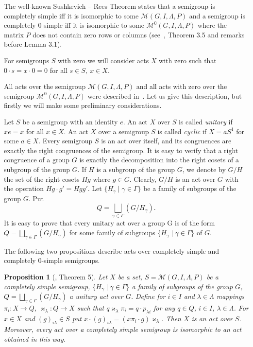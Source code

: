 \documentclass{birkau}
\numberwithin{equation}{section}
\theoremstyle{plain}
\newtheorem{proposition}[theorem]{Proposition}
\theoremstyle{definition}
\begin{document}
	The well-known Sushkevich -- Rees Theorem states that a semigroup is completely simple iff it is isomorphic to some $\mathcal{M}(G, I,\Lambda,P)$ and a semigroup is completely 0-simple iff it is isomorphic to some $\mathcal{M}^0(G,I,\Lambda,P)$ where the matrix $P$ does not contain zero rows or columns (see~\cite{cliff}, Theorem 3.5 and remarks before Lemma 3.1).
	
	For semigroups $S$ with zero we will consider acts $X$ with zero such that $0 \cdot s = x \cdot 0 = 0$ for all $s\in S,\ x\in X$.
	
	All acts over the semigroup $\mathcal{M}(G,I,\Lambda,P)$ and all acts with zero over the semigroup $\mathcal{M}^0(G,I,\Lambda,P)$ were described in~\cite{avdeev}. Let us give this description, but firstly we will make some preliminary considerations.
	
	Let $S$ be a semigroup with an identity $e$. An act $X$ over $S$ is called \textit{unitary} if $xe=x$ for all $x \in X$. An act $X$ over a semigroup $S$ is called \textit{cyclic} if $X=aS^1$ for some $a \in X$. Every semigroup $S$ is an act over itself, and its congruences are exactly the right congruences of the semigroup. It is easy to verify that a right congruence of a group $G$ is exactly the decomposition into the right cosets of a subgroup of the group $G$. If $H$ is a subgroup of the group $G$, we denote by $G/H$ the set of the right cosets $Hg$ where $g \in G$. Clearly, $G/H$ is an act over $G$ with the operation $Hg \cdot g' = Hgg'$. Let $\{ H_\gamma \mid \gamma \in \Gamma \} $ be a family of subgroups of the group $G$. Put $$ Q = \bigsqcup_{\gamma \in \Gamma} (G/H_\gamma). $$ It is easy to prove that every unitary act over a group G is of the form $ Q = \bigsqcup_{\gamma \in \Gamma} (G/H_\gamma) $ for some family of subgroups $\{ H_{\gamma} \mid \gamma \in \Gamma \}$ of $G$.
	
	The following two propositions describe acts over completely simple and completely 0-simple semigroups.
	
	\begin{proposition}[\cite{avdeev}, Theorem 5] \label{pr01}
	    Let $X$ be a set, $S=\mathcal{M}(G,I,\Lambda,P)$ be a completely simple semigroup, $\{ H_\gamma \mid \gamma \in \Gamma \}$ a family of subgroups of the group $G$, $ Q = \bigsqcup_{\gamma \in \Gamma} (G/H_\gamma) $ a unitary act over $G$. Define for $ i \in I$ and $\lambda \in \Lambda$  mappings $\pi_i:X \rightarrow Q$, $\varkappa_\lambda: Q \rightarrow X$ such that $q \varkappa_\lambda \pi_i = q \cdot p_{\lambda i}$ for any $q \in Q$, $i \in I$, $\lambda \in \Lambda$. For $x \in X$ and $(g)_{i \lambda} \in S$ put $x \cdot (g)_{i \lambda} = (x \pi_i \cdot g)\varkappa_{\lambda}$. Then $X$ is an act over $S$. Moreover, every act over a completely simple semigroup is isomorphic to an act obtained in this way.
	\end{proposition}
	
\end{document}
